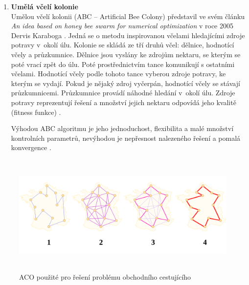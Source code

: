 \begin{enumerate}
	 
	 
	\item \textbf{Umělá včelí kolonie}\\
	Umělou včelí kolonii (ABC -- Artificial Bee Colony) představil ve svém článku \emph{An idea based on honey bee swarm for numerical optimization} v roce 2005 Dervis Karaboga \cite{Karaboga2005}. Jedná se o metodu inspirovanou včelami hledajícími zdroje potravy v~okolí úlu. Kolonie se skládá ze tří druhů včel: dělnice, hodnotící včely a průzkumnice. Dělnice jsou vyslány ke zdrojům nektaru, se kterým se poté vrací zpět do úlu. Poté prostřednictvím tance komunikují s ostatními včelami. Hodnotící včely podle tohoto tance vyberou zdroje potravy, ke kterým se vydají. Pokud je nějaký zdroj vyčerpán, hodnotící včely se stávají průzkumnicemi. Průzkumnice provádí náhodné hledání v~okolí úlu. Zdroje potravy reprezentují řešení a množství jejich nektaru odpovídá jeho kvalitě (fitness funkce) \cite{SinghPal20131218}.
	
	Výhodou ABC algoritmu je jeho jednoduchost, flexibilita a malé množství kontrolních parametrů, nevýhodou je nepřesnost nalezeného řešení a pomalá konvergence \cite{Liang2015}.
	
\end{enumerate}

\begin{figure}[h!]
\begin{center}
	\includegraphics*[width=15cm,height=6cm,keepaspectratio]{obr/Aco_TSP}
\end{center}
\caption{ACO použité pro řešení problému obchodního cestujícího \cite{Dreo2006}}
\label{obr:Aco_TSP}
\end{figure} 


